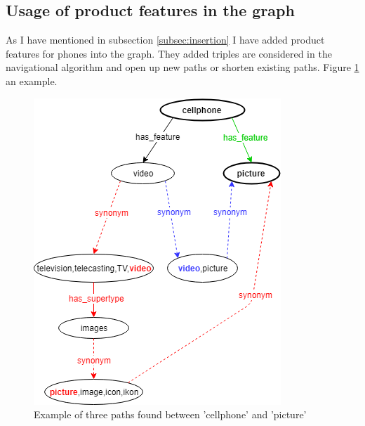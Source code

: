 \subsection{Usage of product features in the graph}
\label{subsec:usage}
As I have mentioned in subsection \ref{subsec:insertion} I have added product features for phones into the graph. They added triples are considered in the navigational algorithm and open up new paths or shorten existing paths. Figure \ref{fig:cellphone-example} an example.\\
\begin{minipage}{0.5\textwidth}
    \begin{figure}[H]
        \centering
        \includegraphics[scale=0.5]{fig/cellphone_navigation.png}
        \caption{Example of three paths found between 'cellphone' and 'picture'}
        \label{fig:cellphone-example}
    \end{figure}
\end{minipage}
